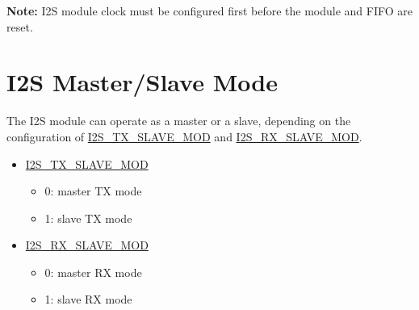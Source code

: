 \documentclass[main\_\_CN.tex]{subfiles}
\begin{document}
{\bfseries Note:}
I2S module clock must be configured first before the module and FIFO are reset.


\section{I2S Master/Slave Mode}

The \chipname{} I2S module can operate as a master or a slave, depending on the configuration of \hyperref[fielddesc:I2STXSLAVEMOD]{I2S\_TX\_SLAVE\_MOD} and \hyperref[fielddesc:I2SRXSLAVEMOD]{I2S\_RX\_SLAVE\_MOD}.

\begin{itemize}
    \item \hyperref[fielddesc:I2STXSLAVEMOD]{I2S\_TX\_SLAVE\_MOD}
    \begin{itemize}
        \item 0: master TX mode
        \item 1: slave TX mode
    \end{itemize}
    \item \hyperref[fielddesc:I2SRXSLAVEMOD]{I2S\_RX\_SLAVE\_MOD}
    \begin{itemize}
        \item 0: master RX mode
        \item 1: slave RX mode
    \end{itemize}
\end{itemize}
\end{document}
